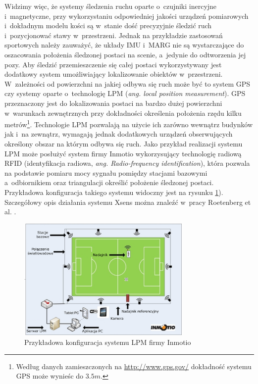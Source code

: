 Widzimy więc, że systemy śledzenia ruchu oparte o~czujniki inercyjne i~magnetyczne, przy wykorzystaniu odpowiedniej jakości urządzeń pomiarowych i~dokładnym modelu kości są w~stanie dość precyzyjnie śledzić ruch i~pozycjonować stawy w~przestrzeni. Jednak na przykładzie zastosowań sportowych \cite{XsensSport1,XsensSport2} należy zauważyć, że układy IMU i~MARG nie są wystarczające do oszacowania położenia śledzonej postaci na scenie, a~jedynie do odtworzenia jej pozy. Aby śledzić przemieszczenie się całej postaci wykorzystywany jest dodatkowy system umożliwiający lokalizowanie obiektów w~przestrzeni. W~zależności od powierzchni na jakiej odbywa się ruch może być to system GPS czy systemy oparte o~technologię LPM (\emph{ang. local position measurement}). GPS przeznaczony jest do lokalizowania postaci na bardzo dużej powierzchni w~warunkach zewnętrznych przy dokładności określenia położenia rzędu kilku metrów\footnote{Według danych zamieszczonych na \url{http://www.gps.gov/} dokładność systemu GPS może wynieśc do $3.5m$.}. Technologie LPM pozwalają na użycie ich zarówno wewnątrz budynków jak i~na zewnątrz, wymagają jednak dodatkowych urządzeń obserwujących określony obszar na którym odbywa się ruch. Jako przykład realizacji systemu LPM może posłużyć system firmy Inmotio\cite{inmotio} wykorzysujący technologię radiową RFID (identyfikacja radiowa, \emph{ang. Radio-frequency identification}), która pozwala na podstawie pomiaru mocy sygnału pomiędzy stacjami bazowymi a~odbiornikiem oraz triangulacji określić położenie śledzonej postaci. Przykładowa konfiguracja takiego systemu widoczny jest na rysunku \ref{fig:literature:inmotio:setup}). Szczegółowy opis działania systemu Xsens można znaleźć w~pracy Roetenberg et al. \cite{Roetenberg2009}.

\begin{figure}[!htp]
	\centering	
	\includegraphics[width=0.75\textwidth]{images/lpm.png}
	\caption{Przykładowa konfiguracja systemu LPM firmy Inmotio\cite{inmotio}}	
	\label{fig:literature:inmotio:setup}	
\end{figure}

